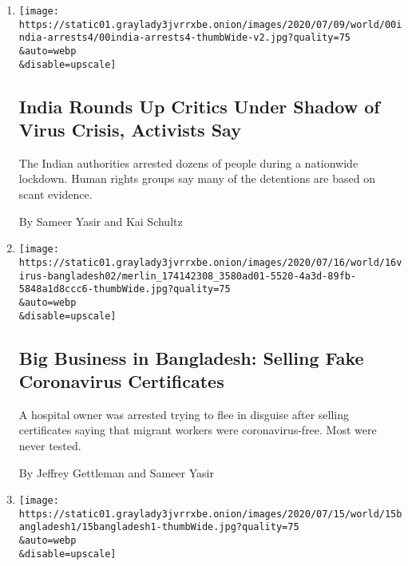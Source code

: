 \begin{enumerate}
\def\labelenumi{\arabic{enumi}.}
\item
  \href{/2020/07/19/world/asia/india-activists-arrests-riots-coronavirus.html}{}

  \texttt{[image: https://static01.graylady3jvrrxbe.onion/images/2020/07/09/world/00india-arrests4/00india-arrests4-thumbWide-v2.jpg?quality=75\\\&auto=webp\\\&disable=upscale]}

  \hypertarget{india-rounds-up-critics-under-shadow-of-virus-crisis-activists-say}{%
  \subsection{India Rounds Up Critics Under Shadow of Virus Crisis,
  Activists
  Say}\label{india-rounds-up-critics-under-shadow-of-virus-crisis-activists-say}}

  The Indian authorities arrested dozens of people during a nationwide
  lockdown. Human rights groups say many of the detentions are based on
  scant evidence.

  By Sameer Yasir and Kai Schultz
\item
  \href{/2020/07/16/world/asia/coronavirus-bangladesh-italy-certificates.html}{}

  \texttt{[image: https://static01.graylady3jvrrxbe.onion/images/2020/07/16/world/16virus-bangladesh02/merlin\_174142308\_3580ad01-5520-4a3d-89fb-5848a1d8ccc6-thumbWide.jpg?quality=75\\\&auto=webp\\\&disable=upscale]}

  \hypertarget{big-business-in-bangladesh-selling-fake-coronavirus-certificates}{%
  \subsection{Big Business in Bangladesh: Selling Fake Coronavirus
  Certificates}\label{big-business-in-bangladesh-selling-fake-coronavirus-certificates}}

  A hospital owner was arrested trying to flee in disguise after selling
  certificates saying that migrant workers were coronavirus-free. Most
  were never tested.

  By Jeffrey Gettleman and Sameer Yasir
\item
  \href{/2020/07/15/world/asia/monsoon-asia-bangladesh-india.html}{}

  \texttt{[image: https://static01.graylady3jvrrxbe.onion/images/2020/07/15/world/15bangladesh1/15bangladesh1-thumbWide.jpg?quality=75\\\&auto=webp\\\&disable=upscale]}


\end{enumerate}
